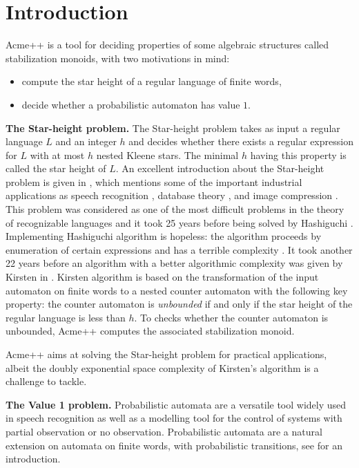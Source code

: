 \section{Introduction}

Acme++ is a tool for deciding properties of some algebraic structures called stabilization monoids,
with two motivations in mind:
\begin{itemize}
\item compute the star height of a regular language of finite words,
\item decide whether a probabilistic automaton has value $1$.
\end{itemize}

\textbf{The Star-height problem.} The Star-height problem takes as input a regular language $L$ and an integer $h$ and decides whether there exists a regular expression for $L$ with at most $h$ nested Kleene stars.
The minimal $h$ having this property is called the star height of $L$. 
An excellent introduction about the Star-height problem is given in \cite{Kirsten05},
which mentions some of the important industrial applications as
speech recognition \cite{Mohri97}, database theory \cite{GT01}, and image compression \cite{CK93,KMT04}.
This problem was considered as one of the most difficult problems in the theory of recognizable languages
and it took 25 years before being solved by Hashiguchi \cite{Hashiguchi88}.
Implementing Hashiguchi algorithm is hopeless: the algorithm proceeds by enumeration of certain expressions
and has a terrible complexity \cite{LS02}.
It took another 22 years before an algorithm with a better algorithmic complexity was given by Kirsten in \cite{Kirsten05}. Kirsten algorithm is based on the transformation of the input automaton on finite words to 
a nested counter automaton with the following key property: the counter automaton is \emph{unbounded}
if and only if the star height of the regular language is less than $h$. To checks whether the
counter automaton is unbounded, Acme++ computes the associated stabilization monoid.

Acme++ aims at solving the Star-height problem for practical applications,
albeit the doubly exponential space complexity of Kirsten's algorithm is a challenge to tackle.


\textbf{The Value 1 problem.} Probabilistic automata are a versatile tool widely used in speech recognition as well as a modelling tool for the control of systems with partial observation or no observation.
Probabilistic automata are a natural extension on automata on finite words,
with probabilistic transitions, see \cite{Rabin63} for an introduction.


